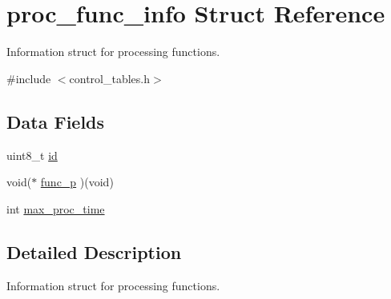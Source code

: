 \hypertarget{structproc__func__info}{
\section{proc\-\_\-func\-\_\-info \-Struct \-Reference}
\label{structproc__func__info}
}


\-Information struct for processing functions.  




{\ttfamily \#include $<$control\-\_\-tables.\-h$>$}

\subsection*{\-Data \-Fields}
\begin{DoxyCompactItemize}
\item 
uint8\-\_\-t \hyperlink{structproc__func__info_a133713acbe60983f171f71e2d81fae3f}{id}
\item 
void($\ast$ \hyperlink{structproc__func__info_ab0d228e3d6f56666fb9d9bf0f25f8d7b}{func\-\_\-p} )(void)
\item 
int \hyperlink{structproc__func__info_a128ad5d7538eef603b5f0dab9c42174b}{max\-\_\-proc\-\_\-time}
\end{DoxyCompactItemize}


\subsection{\-Detailed \-Description}
\-Information struct for processing functions. 

